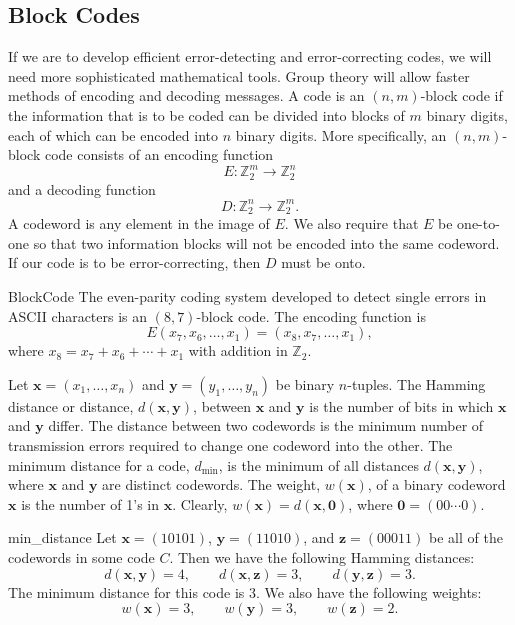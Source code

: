  
\subsection*{Block Codes}
 
 
If we are to develop efficient error-detecting and error-correcting
codes, we will need more sophisticated mathematical tools.  Group
theory  will allow faster methods of encoding and decoding messages. A
code is an $(n, m)$-{\bfi block code\/} if the information that is to be
coded can be divided into blocks of $m$ binary digits, each of which
can be encoded into $n$ binary digits. More specifically, an $(n,
m)$-block code consists of an {\bfi encoding function} 
\[
E:{\mathbb Z}^{m}_{2} \rightarrow {\mathbb Z}^{n}_{2}
\]
and a {\bfi decoding function}
\[
D:{\mathbb Z}^{n}_{2} \rightarrow {\mathbb Z}^{m}_{2}.
\]
A {\bfi codeword\/} is any element in the image of $E$. We also require
that $E$ be one-to-one so that two information blocks will not be
encoded into the same codeword. If our code is to be error-correcting,
then $D$ must be onto.
 
 
\begin{example}{BlockCode}
The even-parity coding system developed to detect single errors in
ASCII characters is an $(8,7)$-block code. The encoding function is
\[
E(x_7, x_6, \ldots, x_1) = (x_8, x_7,  \ldots, x_1),
\]
where $x_8 = x_7 + x_6 + \cdots + x_1$ with addition in ${\mathbb Z}_2$. 
\end{example}
 

 
Let ${\mathbf x} = (x_1, \ldots, x_n)$ and ${\mathbf y} = (y_1, \ldots,
y_n)$ be binary $n$-tuples. The {\bfi Hamming distance\/} or {\bfi distance}, $d({\mathbf x}, {\mathbf
y})$\label{noteHammingdist}, between ${\mathbf x}$ and ${\mathbf y}$ is
the number of bits in which ${\mathbf x}$ and ${\mathbf y}$ differ. The
distance between two codewords is the minimum number of transmission
errors required to change one codeword into the other. The
{\bfi minimum distance\/} for a code,
$d_{\min}$\label{notemindist}, is the minimum of all distances
$d({\mathbf x}, {\mathbf y})$, where ${\mathbf x}$ and ${\mathbf y}$ are
distinct codewords. The {\bfi weight},
$w({\mathbf x})$\label{noteweight}, of a binary codeword ${\mathbf x}$ is
the number of 1's in ${\mathbf x}$. Clearly, $w({\mathbf x}) = d({\mathbf
x}, {\mathbf 0})$, where ${\mathbf 0} = (00 \cdots 0)$. 
 
 
\begin{example}{min_distance}
Let ${\mathbf x} = (10101)$, ${\mathbf y} = (11010)$, and ${\mathbf z} =
(00011)$ be all of the codewords in some code $C$. Then we have the
following Hamming distances: 
\[
d({\mathbf x},{\mathbf y}) = 4, \qquad
d({\mathbf x},{\mathbf z}) = 3, \qquad
d({\mathbf y},{\mathbf z}) = 3.
\]
The minimum distance  for this code is 3. We also have the
following weights: 
\[
w({\mathbf x}) = 3, \qquad
w({\mathbf y}) = 3, \qquad
w({\mathbf z}) = 2.
\]
\end{example}
 
